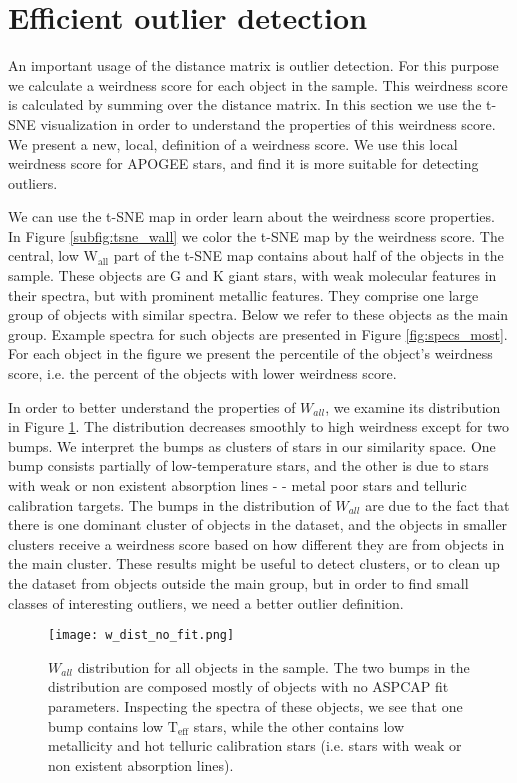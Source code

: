 \documentclass[fleqn,usenatbib]{mnras}
\begin{document}
\section{Efficient outlier detection}
\label{nnws_subsec}
An important usage of the distance matrix is outlier detection. For this purpose we calculate a weirdness score for each object in the sample. This weirdness score is calculated by summing over the distance matrix. In this section we use the t-SNE visualization in order to understand the properties of this weirdness score. We present a new, local, definition of a weirdness score. We use this local weirdness score for APOGEE stars, and find it is more suitable for detecting outliers.

We can use the t-SNE map in order learn about the weirdness score properties. In Figure \ref{subfig:tsne_wall} we color the t-SNE map by the weirdness score. The central, low $\mathrm{W_{all}}$ part of the t-SNE map contains about half of the objects in the sample. These objects are $\mathrm{G}$ and $\mathrm{K}$ giant stars, 
with weak molecular features in their spectra, 
but with prominent metallic features. They comprise one large group of objects with similar spectra. Below we refer to these objects as the main group. Example spectra for such objects are presented in Figure  \ref{fig:specs_most}. For each object in the figure we present the percentile of the object's weirdness score, i.e. the percent of the objects with lower weirdness score. 


In order to better understand the properties of $W_{all}$, we examine its distribution in Figure \ref{fig:wrdns_dist}. The distribution decreases smoothly to high weirdness except for two bumps. We interpret the bumps as clusters of stars in our similarity space. One bump consists partially of low-temperature stars, and the other is due to stars with weak or non existent absorption lines - - metal poor stars and telluric calibration targets. 
The bumps in the distribution of $W_{all}$ are due to the fact that there is one dominant cluster of objects in the dataset, and the objects in smaller clusters receive a weirdness score based on how different they are from objects in the main cluster. These results might be useful to detect clusters, or to clean up the dataset from objects outside the main group, but in order to find small classes of interesting outliers, we need a better outlier definition. 


\begin{figure}
  \texttt{[image: w\_dist\_no\_fit.png]}
  \caption{$W_{all}$ distribution for all objects in the sample. The two bumps in the distribution are composed mostly of objects with no ASPCAP fit parameters. Inspecting the spectra of these objects, we see that one bump contains low $\mathrm{T}_{\mathrm{eff}}$ stars, while the other contains low metallicity and hot telluric calibration stars (i.e. stars with weak or non existent absorption lines).}
  \label{fig:wrdns_dist}
 \end{figure}
\end{document}
